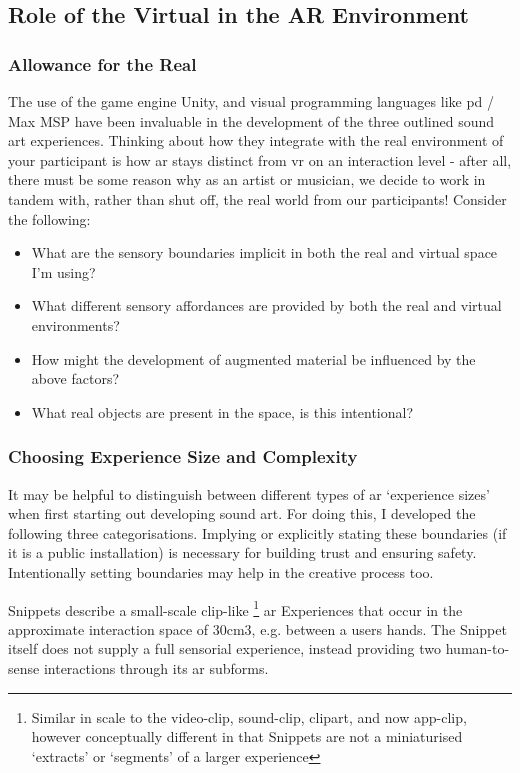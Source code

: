 \subsection{Role of the Virtual in the AR Environment}\label{sec: discussion-guidelines-environment}
\subsubsection{Allowance for the Real}
The use of the game engine Unity, and visual programming languages like \gls{pd} / Max MSP have been invaluable in the development of the three outlined sound \gls{art} experiences. Thinking about how they integrate with the real environment of your participant is how \gls{ar} stays distinct from \gls{vr} on an interaction level - after all, there must be some reason why as an artist or musician, we decide to work in tandem with, rather than shut off, the real world from our participants! Consider the following:
\begin{itemize}
    \item What are the sensory boundaries implicit in both the real and virtual space I'm using? 
    \item What different sensory affordances are provided by both the real and virtual environments? 
    \item How might the development of augmented material be influenced by the above factors?
    \item What real objects are present in the space, is this intentional?
\end{itemize}

\subsubsection{Choosing Experience Size and Complexity}
It may be helpful to distinguish between different types of \gls{ar} `experience sizes' when first starting out developing sound \gls{art}. For doing this, I developed the following three categorisations. Implying or explicitly stating these boundaries (if it is a public installation) is necessary for building trust and ensuring safety. Intentionally setting boundaries may help in the creative process too.

Snippets describe a small-scale clip-like \footnote{Similar in scale to the video-clip, sound-clip, clipart, and now app-clip, however conceptually different in that Snippets are not a miniaturised `extracts' or `segments' of a larger experience} \gls{ar} Experiences that occur in the approximate interaction space of 30cm3, e.g. between a users hands. The Snippet itself does not supply a full sensorial experience, instead providing two human-to-sense interactions through its \gls{ar} subforms.

